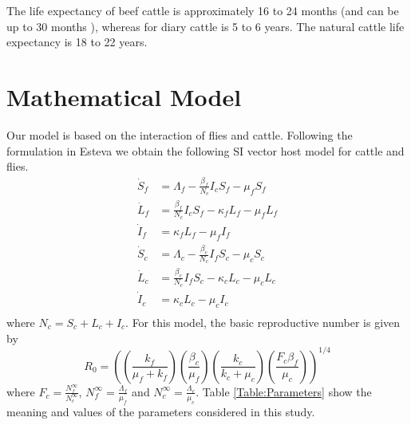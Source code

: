 \documentclass[preprint,12pt]{elsarticle}
\begin{document}
\noindent The life expectancy of beef cattle is approximately 16 to 24 months (and can be up to 30 months \cite{stanley:2003}), whereas for diary cattle is 5 to 6 years. The natural cattle life expectancy is 18 to 22 years.


\section{Mathematical Model}

\noindent Our model is based on the interaction of flies and cattle. 
Following the formulation in Esteva \cite{Esteva:1998} we obtain the 
following SI vector host model for cattle and flies.
\begin{equation}\label{Eq:SIvectorhostmodel}
\begin{aligned}
    \dot{S}_f&= 
        \Lambda_f-\frac{\beta_f}{N_c}I_cS_f-\mu_fS_f
    \\
    \dot{L}_f&= 
        \frac{\beta_f}{N_c}I_cS_f-\kappa_fL_f-\mu_fL_f
    \\
    \dot{I}_f&= 
        \kappa_fL_f-\mu_fI_f
    \\
    \dot{S}_c&= 
        \Lambda_c-\frac{\beta_c}{N_c}I_fS_c-\mu_cS_c
    \\
    \dot{L}_c&= 
        \frac{\beta_c}{N_c}I_fS_c-\kappa_cL_c-\mu_cL_c
    \\
    \dot{I}_c&= \kappa_cL_c-\mu_cI_c
    \\
\end{aligned}
\end{equation}
where $N_c=S_c+L_c+I_c$. For this model, the basic reproductive number is given by
 \begin{equation}
     R_0=\left(\left(\frac{k_f}{\mu_f+k_f}\right)\left(\frac{\beta_c}{\mu_f}\right)\left(\frac{k_c}{k_c+\mu_c}\right)\left(\frac{F_c\beta_f}{\mu_c} \right) \right)^{1/4}
 \end{equation}
 where 
 $
    \displaystyle
    F_c=\frac{N_f^{\infty}}{N_c^{\infty}}
$, 
$
    \displaystyle
    N_f^{\infty}=\frac{\Lambda_f}{\mu_f}
$ 
 and 
$
    \displaystyle
    N_c^{\infty} = \frac{\Lambda_c}{\mu_c}
$. Table \ref{Table:Parameters} show 
 the meaning and values of the parameters considered in this study.
 

\end{document}
